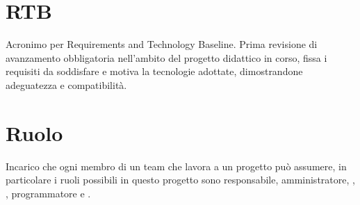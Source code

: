 \section{RTB}\label{sec:Requirements and Technology Baseline}
Acronimo per Requirements and Technology Baseline. Prima revisione di avanzamento obbligatoria nell'ambito del progetto didattico in corso, fissa i requisiti da soddisfare e motiva la tecnologie adottate, dimostrandone adeguatezza e compatibilità.
\section{Ruolo}\label{sec:Ruoli}
Incarico che ogni membro di un team che lavora a un progetto può assumere, in particolare i ruoli possibili in questo progetto sono responsabile, amministratore, , , programmatore e .
